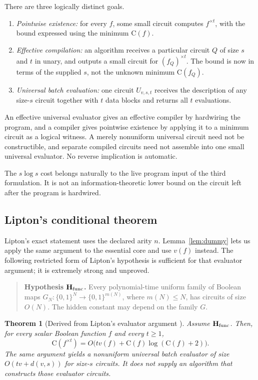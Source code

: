 \documentclass[11pt]{article}
\newtheorem{theorem}{Theorem}[section]
\theoremstyle{definition}
\newcommand{\bits}{\{0,1\}}
\newcommand{\C}{\mathrm{C}}
\begin{document}
There are three logically distinct goals.

\begin{enumerate}[label=\textnormal{(\roman*)}]
\item \emph{Pointwise existence:} for every $f$, some small circuit computes
  $f^{\times t}$, with the bound expressed using the minimum $\C(f)$.
\item \emph{Effective compilation:} an algorithm receives a particular
  circuit $Q$ of size $s$ and $t$ in unary, and outputs a small circuit for
  $(f_Q)^{\times t}$.  The bound is now in terms of the supplied $s$, not the
  unknown minimum $\C(f_Q)$.
\item \emph{Universal batch evaluation:} one circuit $U_{v,s,t}$ receives
  the description of any size-$s$ circuit together with $t$ data blocks and
  returns all $t$ evaluations.
\end{enumerate}

An effective universal evaluator gives an effective compiler by hardwiring
the program, and a compiler gives pointwise existence by applying it to a
minimum circuit as a logical witness.  A merely nonuniform universal circuit
need not be constructible, and separate compiled circuits need not assemble
into one small universal evaluator.  No reverse implication is automatic.

The $s\log s$ cost belongs naturally to the live program input of the third
formulation.  It is not an information-theoretic lower bound on the circuit
left after the program is hardwired.

\subsection{Lipton's conditional theorem}

Lipton's exact statement uses the declared arity $n$.  Lemma~\ref{lem:dummy}
lets us apply the same argument to the essential core and use $v(f)$ instead.
The following restricted form of Lipton's hypothesis is sufficient for that
evaluator argument; it is extremely strong and unproved.

\begin{quote}
\textbf{Hypothesis $\mathbf H_{\rm func}$.}
Every polynomial-time uniform family of Boolean maps
$G_N:\bits^N\to\bits^{m(N)}$, where $m(N)\le N$, has circuits of size
$O(N)$.  The hidden constant may depend on the family $G$.
\end{quote}

\begin{theorem}[Derived from Lipton's evaluator argument \cite{Lipton1994}]
\label{thm:lipton}
Assume $\mathbf H_{\rm func}$.  Then, for every scalar Boolean function $f$
and every $t\ge1$,
\[
  \C(f^{\times t})
  =O\bigl(t v(f)+\C(f)\log(\C(f)+2)\bigr).
\]
The same argument yields a nonuniform universal batch evaluator
of size $O(tv+d(v,s))$ for size-$s$ circuits.  It does not supply an
algorithm that constructs those evaluator circuits.
\end{theorem}
\end{document}
